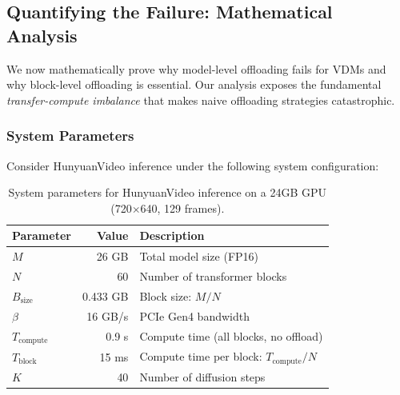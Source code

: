 
\subsection{Quantifying the Failure: Mathematical Analysis}
\label{subsec:quantifying_failure}

We now mathematically prove why model-level offloading fails for VDMs and why block-level offloading is essential. Our analysis exposes the fundamental \textit{transfer-compute imbalance} that makes naive offloading strategies catastrophic.

\subsubsection{System Parameters}

Consider HunyuanVideo inference under the following system configuration:

\begin{table}[h]
\centering
\small
\begin{tabular}{lrl}
\toprule
\textbf{Parameter} & \textbf{Value} & \textbf{Description} \\
\midrule
$M$ & 26 GB & Total model size (FP16) \\
$N$ & 60 & Number of transformer blocks \\
$B_{\text{size}}$ & 0.433 GB & Block size: $M / N$ \\
$\beta$ & 16 GB/s & PCIe Gen4 bandwidth \\
$T_{\text{compute}}$ & 0.9 s & Compute time (all blocks, no offload) \\
$T_{\text{block}}$ & 15 ms & Compute time per block: $T_{\text{compute}} / N$ \\
$K$ & 40 & Number of diffusion steps \\
\bottomrule
\end{tabular}
\caption{System parameters for HunyuanVideo inference on a 24GB GPU (720$\times$640, 129 frames).}
\label{tab:system_params}
\end{table}

